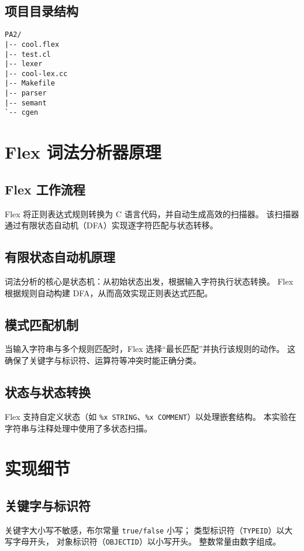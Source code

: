 \documentclass[a4paper,12pt]{article}
\begin{document}
\subsection{项目目录结构}
\begin{lstlisting}
PA2/
|-- cool.flex
|-- test.cl
|-- lexer
|-- cool-lex.cc
|-- Makefile
|-- parser
|-- semant
`-- cgen
\end{lstlisting}

\section{Flex 词法分析器原理}
\subsection{Flex 工作流程}
Flex 将正则表达式规则转换为 C 语言代码，并自动生成高效的扫描器。
该扫描器通过有限状态自动机（DFA）实现逐字符匹配与状态转移。

\subsection{有限状态自动机原理}
词法分析的核心是状态机：从初始状态出发，根据输入字符执行状态转换。
Flex 根据规则自动构建 DFA，从而高效实现正则表达式匹配。

\subsection{模式匹配机制}
当输入字符串与多个规则匹配时，Flex 选择“最长匹配”并执行该规则的动作。
这确保了关键字与标识符、运算符等冲突时能正确分类。

\subsection{状态与状态转换}
Flex 支持自定义状态（如 \texttt{\%x STRING}、\texttt{\%x COMMENT}）以处理嵌套结构。
本实验在字符串与注释处理中使用了多状态扫描。

\section{实现细节}
\subsection{关键字与标识符}
关键字大小写不敏感，布尔常量 \texttt{true/false} 小写；
类型标识符（\texttt{TYPEID}）以大写字母开头，
对象标识符（\texttt{OBJECTID}）以小写开头。
整数常量由数字组成。
\end{document}
